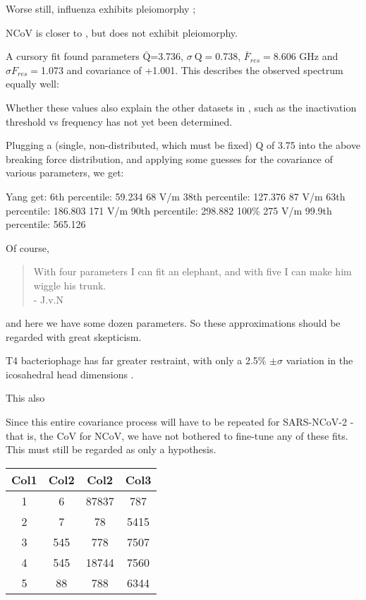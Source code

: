 \documentclass[paper.tex]{subfiles}
\begin{document}
Worse still, influenza exhibits pleiomorphy \cite{Influenza2006}; 



NCoV is closer to \cite{Viral2020}, but does not exhibit pleiomorphy.

A cursory fit found parameters $\bar{\text{Q}}$=3.736,  $\sigma \ \text{Q} = $0.738, $\bar{F}_{res}=$8.606 GHz and $\sigma {F_{res}}=$1.073 and covariance of +1.001. This describes the observed spectrum equally well:

Whether these values also explain the other datasets in \cite{Efficient2015}, such as the inactivation threshold vs frequency has not yet been determined.

Plugging a (single, non-distributed, which must be fixed) Q of 3.75 into the above breaking force distribution, and applying some guesses for the covariance of various parameters, we get:

								Yang get:
6th percentile: 59.234       68 V/m
38th percentile: 127.376		87 V/m
63th percentile: 186.803		171 V/m
90th percentile: 298.882     100\% 275 V/m
99.9th percentile: 565.126 

Of course, 
\begin{quote}
	With four parameters I can fit an elephant, and with five I can make him wiggle his trunk. \\- J.v.N
\end{quote}

and here we have some dozen parameters. So these approximations should be regarded with great skepticism.


T4 bacteriophage has far greater restraint, with only a 2.5\% $\pm \sigma$ variation in the icosahedral head dimensions \cite{Head1988}.\footnotemark


This also 

Since this entire covariance process will have to be repeated for SARS-NCoV-2 - that is, the CoV for NCoV, we have not bothered to fine-tune any of these fits. This must still be regarded as only a hypothesis.

\begin{center}
	\begin{tabular}{||c c c c||} 
		\hline
		Col1 & Col2 & Col2 & Col3 \\ [0.5ex] 
		\hline\hline
		1 & 6 & 87837 & 787 \\ 
		\hline
		2 & 7 & 78 & 5415 \\
		\hline
		3 & 545 & 778 & 7507 \\
		\hline
		4 & 545 & 18744 & 7560 \\
		\hline
		5 & 88 & 788 & 6344 \\ [1ex] 
		\hline
	\end{tabular}
\end{center}



	
\end{document}
